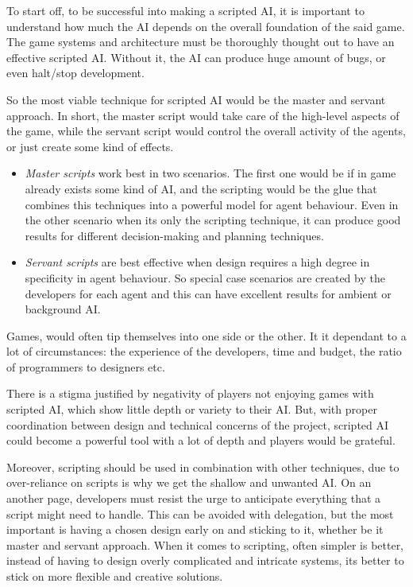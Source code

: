 \documentclass[a4paper, 12pt]{book}
\begin{document}
To start off, to be successful into making a scripted AI, it is important to understand how much the AI depends on the overall foundation of the said game. The game systems and architecture must be thoroughly thought out to have an effective scripted AI. Without it, the AI can produce huge amount of bugs, or even halt/stop development.

So the most viable technique for scripted AI would be the master and servant approach. In short, the master script would take care of the high-level aspects of the game, while the servant script would control the overall activity of the agents, or just create some kind of effects.  

\begin{itemize}
    \item \emph{Master scripts} work best in two scenarios. The first one would be if in game already exists some kind of AI, and the scripting would be the glue that combines this techniques into a powerful model for agent behaviour. Even in the other scenario when its only the scripting technique, it can produce good results for different decision-making and planning techniques.
    \item \emph{Servant scripts} are best effective when design requires a high degree in specificity in agent behaviour. So special case scenarios are created by the developers for each agent and this can have excellent results for ambient or background AI.
\end{itemize}

Games, would often tip themselves into one side or the other. It it dependant to a lot of circumstances: the experience of the developers, time and budget, the ratio of programmers to designers etc.

There is a stigma justified by negativity of players not enjoying games with scripted AI, which show little depth or variety to their AI. But, with proper coordination between design and technical concerns of the project, scripted AI could become a powerful tool with a lot of depth and players would be grateful.

Moreover, scripting should be used in combination with other techniques, due to over-reliance on scripts is why we get the shallow and unwanted AI. On an another page, developers must resist the urge to anticipate everything that a script might need to handle. This can be avoided with delegation, but the most important is having a chosen design early on and sticking to it, whether be it master and servant approach. When it comes to scripting, often simpler is better, instead of having to design overly complicated and intricate systems, its better to stick on more flexible and creative solutions.
\end{document}
